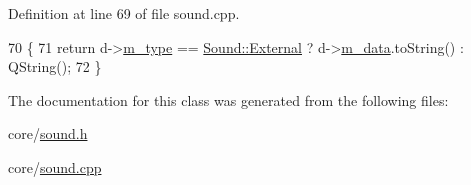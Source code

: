 Definition at line 69 of file sound.\+cpp.


\begin{DoxyCode}
70 \{
71     \textcolor{keywordflow}{return} d->\hyperlink{classSound_1_1Private_ab2ddecacdbe04eb2b02a7cea13772fe3}{m\_type} == \hyperlink{classOkular_1_1Sound_aed586d1d0455f4309b1309b9954d5c04a6b086485afe0876219888635155ab044}{Sound::External} ? d->\hyperlink{classSound_1_1Private_a7768921bd907eb0ae58ef9b91f611402}{m\_data}.toString() : QString();
72 \}
\end{DoxyCode}


The documentation for this class was generated from the following files\+:\begin{DoxyCompactItemize}
\item 
core/\hyperlink{sound_8h}{sound.\+h}\item 
core/\hyperlink{sound_8cpp}{sound.\+cpp}\end{DoxyCompactItemize}
